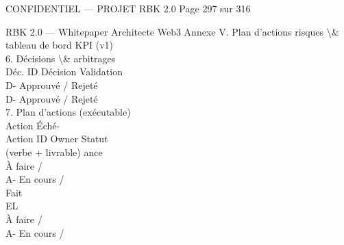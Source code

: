 \vspace{0.5em}
\vspace{0.5em}
\begin{confidential}CONFIDENTIEL — PROJET RBK 2.0                            Page 297 sur 316\end{confidential}
RBK 2.0 — Whitepaper Architecte Web3                                                                             Annexe V. Plan d’actions risques \textbackslash{}& tableau de bord KPI (v1)\\
\vspace{0.5em}
\vspace{0.5em}
6. Décisions \textbackslash{}& arbitrages\\
\vspace{0.5em}
Déc. ID              Décision                                                        Validation\\
D-                                                                                   Approuvé / Rejeté\\
D-                                                                                   Approuvé / Rejeté\\
\vspace{0.5em}
\vspace{0.5em}
\vspace{0.5em}
7. Plan d’actions (exécutable)\\
\vspace{0.5em}
Action                                                           Éché-\\
Action ID                                                           Owner                         Statut\\
(verbe + livrable)                                               ance\\
À faire /\\
A-                                                                                                En cours /\\
Fait\\
\vspace{0.5em}
\vspace{0.5em}
\vspace{0.5em}
\vspace{0.5em}
EL\\
À faire /\\
A-                                                                                                En cours /\\
\vspace{0.5em}
